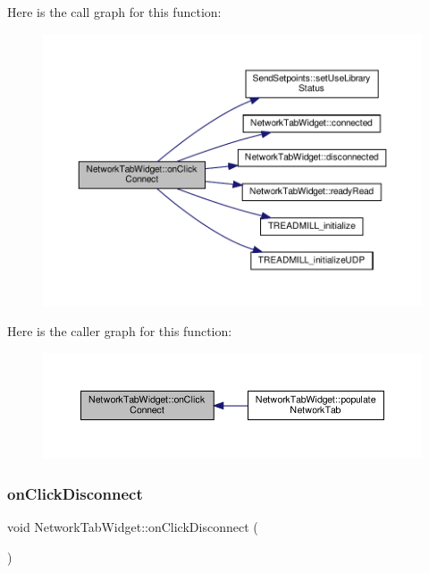 Here is the call graph for this function\+:
\nopagebreak
\begin{figure}[H]
\begin{center}
\leavevmode
\includegraphics[width=350pt]{class_network_tab_widget_a852eff05d0a613eb7b8fc0e0bfdd0736_cgraph}
\end{center}
\end{figure}
Here is the caller graph for this function\+:
\nopagebreak
\begin{figure}[H]
\begin{center}
\leavevmode
\includegraphics[width=350pt]{class_network_tab_widget_a852eff05d0a613eb7b8fc0e0bfdd0736_icgraph}
\end{center}
\end{figure}
\mbox{\label{class_network_tab_widget_a31b849f35ea3981762da5e7d5e951371}} 
\subsubsection{\texorpdfstring{on\+Click\+Disconnect}{onClickDisconnect}}
{\footnotesize\ttfamily void Network\+Tab\+Widget\+::on\+Click\+Disconnect (\begin{DoxyParamCaption}{ }\end{DoxyParamCaption})\hspace{0.3cm}{\ttfamily [slot]}}



